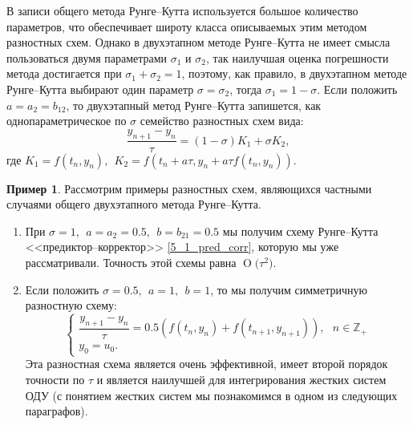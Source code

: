 \documentclass[11pt,a4paper,twoside]{report}
\numberwithin{equation}{section}
\theoremstyle{definition}
\newtheorem*{example*}{Пример}
\theoremstyle{plain}
\newcommand{\bigO}[1]{\ensuremath{\operatorname{O}\bigl(#1\bigr)}}
\begin{document}
В записи общего метода Рунге--Кутта используется большое количество
параметров, что обеспечивает широту класса описываемых этим методом
разностных схем. Однако в двухэтапном методе Рунге--Кутта не имеет смысла
пользоваться двумя параметрами $\sigma_1$ и $\sigma_2$, так наилучшая оценка
погрешности метода достигается при $\sigma_1 + \sigma_2 = 1$, поэтому,
как правило, в двухэтапном методе Рунге--Кутта выбирают один параметр
$\sigma = \sigma_2$, тогда $\sigma_1 = 1 - \sigma$. Если положить
$a = a_2 = b_{12}$, то двухэтапный метод Рунге--Кутта запишется, как
однопараметрическое по $\sigma$ семейство разностных схем вида:
%
$$
    \dfrac{y_{n+1} - y_n}{\tau} = (1 - \sigma)K_1 + \sigma K_2,
$$
%
где $K_1 = f(t_n, y_n),~~K_2 = f(t_n + a\tau, y_n + a\tau f(t_n, y_n))$.

%
\begin{example*}
%
    Рассмотрим примеры разностных схем, являющихся частными случаями
    общего двухэтапного метода Рунге--Кутта.
    \begin{enumerate}
        \item При $\sigma=1,~~a=a_2=0.5,~~b=b_{21}=0.5$ мы получим схему Рунге--Кутта
        <<предиктор--корректор>> \eqref{5_1_pred_corr}, которую мы уже рассматривали.
        Точность этой схемы равна $\bigO{\tau^2}$.

        \item Если положить $\sigma=0.5,~~a=1,~~b=1$, то мы получим симметричную разностную схему:
        \begin{equation}
            \label{simm_scheme}
            \begin{cases}
                \dfrac{y_{n+1} - y_n}{\tau} = 0.5 \left(f(t_n, y_n) +
                f(t_{n+1}, y_{n+1})\right),~~~n\in\mathbb{Z}_+ \\
                y_0 = u_0.
            \end{cases}
        \end{equation}
        Эта разностная схема является очень эффективной,
        имеет второй порядок точности по $\tau$ и является наилучшей
        для интегрирования жестких систем ОДУ (с понятием жестких систем
        мы познакомимся в одном из следующих параграфов).
    \end{enumerate}
\end{example*}
%
\end{document}
